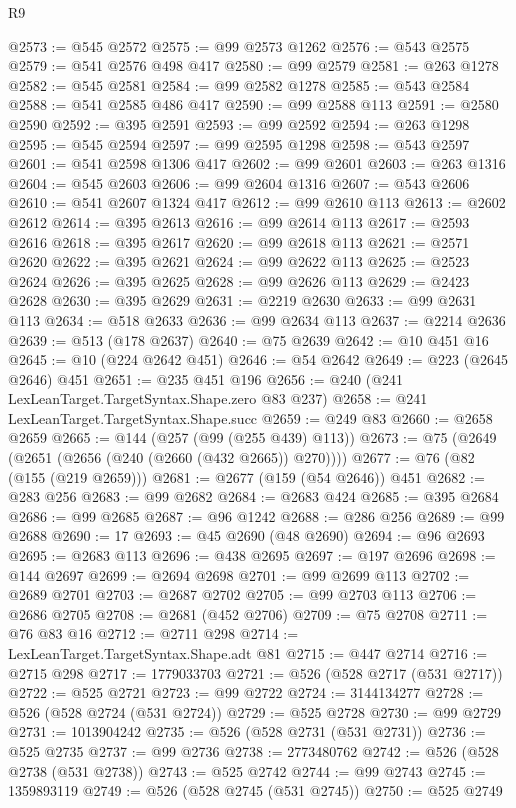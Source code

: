 \begin{lexlean}{R9}
\begin{coremodule}
@2573 := @545 @2572
@2575 := @99 @2573 @1262
@2576 := @543 @2575
@2579 := @541 @2576 @498 @417
@2580 := @99 @2579
@2581 := @263 @1278
@2582 := @545 @2581
@2584 := @99 @2582 @1278
@2585 := @543 @2584
@2588 := @541 @2585 @486 @417
@2590 := @99 @2588 @113
@2591 := @2580 @2590
@2592 := @395 @2591
@2593 := @99 @2592
@2594 := @263 @1298
@2595 := @545 @2594
@2597 := @99 @2595 @1298
@2598 := @543 @2597
@2601 := @541 @2598 @1306 @417
@2602 := @99 @2601
@2603 := @263 @1316
@2604 := @545 @2603
@2606 := @99 @2604 @1316
@2607 := @543 @2606
@2610 := @541 @2607 @1324 @417
@2612 := @99 @2610 @113
@2613 := @2602 @2612
@2614 := @395 @2613
@2616 := @99 @2614 @113
@2617 := @2593 @2616
@2618 := @395 @2617
@2620 := @99 @2618 @113
@2621 := @2571 @2620
@2622 := @395 @2621
@2624 := @99 @2622 @113
@2625 := @2523 @2624
@2626 := @395 @2625
@2628 := @99 @2626 @113
@2629 := @2423 @2628
@2630 := @395 @2629
@2631 := @2219 @2630
@2633 := @99 @2631 @113
@2634 := @518 @2633
@2636 := @99 @2634 @113
@2637 := @2214 @2636
@2639 := @513 (@178 @2637)
@2640 := @75 @2639
@2642 := @10 @451 @16
@2645 := @10 (@224 @2642 @451)
@2646 := @54 @2642
@2649 := @223 (@2645 @2646) @451
@2651 := @235 @451 @196
@2656 := @240 (@241 LexLeanTarget.TargetSyntax.Shape.zero @83 @237)
@2658 := @241 LexLeanTarget.TargetSyntax.Shape.succ
@2659 := @249 @83
@2660 := @2658 @2659
@2665 := @144 (@257 (@99 (@255 @439) @113))
@2673 := @75 (@2649 (@2651 (@2656 (@240 (@2660 (@432 @2665)) @270))))
@2677 := @76 (@82 (@155 (@219 @2659)))
@2681 := @2677 (@159 (@54 @2646)) @451
@2682 := @283 @256
@2683 := @99 @2682
@2684 := @2683 @424
@2685 := @395 @2684
@2686 := @99 @2685
@2687 := @96 @1242
@2688 := @286 @256
@2689 := @99 @2688
@2690 := 17
@2693 := @45 @2690 (@48 @2690)
@2694 := @96 @2693
@2695 := @2683 @113
@2696 := @438 @2695
@2697 := @197 @2696
@2698 := @144 @2697
@2699 := @2694 @2698
@2701 := @99 @2699 @113
@2702 := @2689 @2701
@2703 := @2687 @2702
@2705 := @99 @2703 @113
@2706 := @2686 @2705
@2708 := @2681 (@452 @2706)
@2709 := @75 @2708
@2711 := @76 @83 @16
@2712 := @2711 @298
@2714 := LexLeanTarget.TargetSyntax.Shape.adt @81
@2715 := @447 @2714
@2716 := @2715 @298
@2717 := 1779033703
@2721 := @526 (@528 @2717 (@531 @2717))
@2722 := @525 @2721
@2723 := @99 @2722
@2724 := 3144134277
@2728 := @526 (@528 @2724 (@531 @2724))
@2729 := @525 @2728
@2730 := @99 @2729
@2731 := 1013904242
@2735 := @526 (@528 @2731 (@531 @2731))
@2736 := @525 @2735
@2737 := @99 @2736
@2738 := 2773480762
@2742 := @526 (@528 @2738 (@531 @2738))
@2743 := @525 @2742
@2744 := @99 @2743
@2745 := 1359893119
@2749 := @526 (@528 @2745 (@531 @2745))
@2750 := @525 @2749

\end{coremodule}
\end{lexlean}
